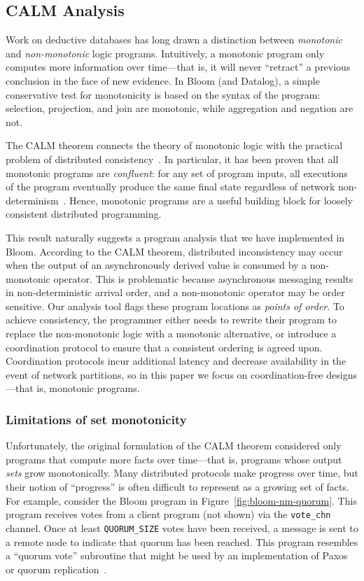\subsection{CALM Analysis}
\label{sec:bg-calm}

Work on deductive databases has long drawn a distinction between
\emph{monotonic} and \emph{non-monotonic} logic programs. Intuitively, a
monotonic program only computes more information over time---that is, it will
never ``retract'' a previous conclusion in the face of new evidence. In Bloom
(and Datalog), a simple conservative test for monotonicity is based on the
syntax of the program: selection, projection, and join are monotonic, while
aggregation and negation are not.

The CALM theorem connects the theory of monotonic logic with the practical
problem of distributed consistency~\cite{Alvaro2011,Hellerstein2010}. In
particular, it has been proven that all monotonic programs are \emph{confluent}:
for any set of program inputs, all executions of the program eventually produce
the same final state regardless of network
non-determinism~\cite{Ameloot2011}. Hence, monotonic programs are a useful
building block for loosely consistent distributed programming.

This result naturally suggests a program analysis that we have implemented in
Bloom. According to the CALM theorem, distributed inconsistency may occur when
the output of an asynchronously derived value is consumed by a non-monotonic
operator. This is problematic because asynchronous messaging results in
non-deterministic arrival order, and a non-monotonic operator may be order
sensitive. Our analysis tool flags these program locations as \emph{points of
  order}. To achieve consistency, the programmer either needs to rewrite their
program to replace the non-monotonic logic with a monotonic alternative, or
introduce a coordination protocol to ensure that a consistent ordering is agreed
upon. Coordination protocols incur additional latency and decrease availability
in the event of network partitions, so in this paper we focus on
coordination-free designs---that is, monotonic programs.

\subsubsection{Limitations of set monotonicity}
Unfortunately, the original formulation of the CALM theorem considered only
programs that compute more facts over time---that is, programs whose output
\emph{sets} grow monotonically. Many distributed protocols make progress
over time, but their notion of ``progress'' is often difficult to represent as a
growing set of facts. For example, consider the Bloom program in
Figure~\ref{fig:bloom-nm-quorum}. This program receives votes from a client
program (not shown) via the \texttt{vote\_chn} channel. Once at least
\texttt{QUORUM\_SIZE} votes have been received, a message is sent to a remote
node to indicate that quorum has been reached. This program resembles a ``quorum
vote'' subroutine that might be used by an implementation of
Paxos~\cite{Lamport1998} or quorum replication~\cite{Gifford1979}.

